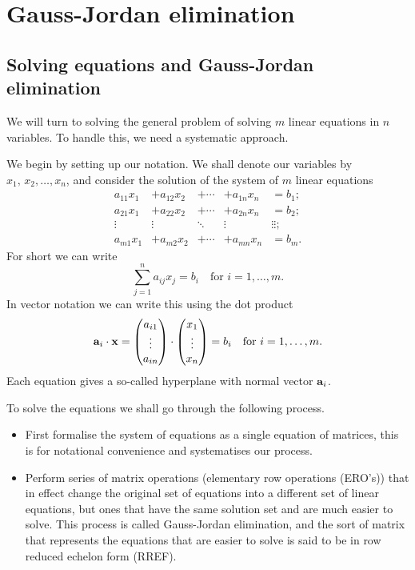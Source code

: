 \documentclass[10pt, a4paper]{article}
\begin{document}
\newpage

\section{Gauss-Jordan elimination}

\subsection{Solving equations and Gauss-Jordan elimination}
We will turn to solving the general problem of solving $m$ linear equations in $n$ variables. To handle this, we need a systematic approach.

We begin by setting up our notation. We shall denote our variables by $x_1,\,x_2,\dotsc,x_n$, and consider the solution of the system of $m$ linear equations
\begin{align*}
    a_{1 1}x_{1} &+ a_{1 2}x_2 &+ \dotsi &+ a_{1 n}x_n &= b_1; \\ 
    a_{2 1}x_{1} &+ a_{2 2}x_2 &+ \dotsi &+ a_{2 n}x_n &= b_2; \\ 
    \vdots & \vdots & \ddots & \vdots &\vdots \vdots; \\ 
    a_{m 1}x_{1} &+ a_{m 2}x_2 &+ \dotsi &+ a_{m n}x_n &= b_m.
\end{align*}
For short we can write
\[
\sum_{j = 1}^{n}a_{ij}x_{j} = b_{i}\quad\text{for } i = 1,\dotsc,m.
\]
In vector notation we can write this using the dot product
\[
\mathbf{a}_i \cdot \mathbf{x} = \begin{pmatrix}
    a_{i 1} \\ \vdots \\ a_{i n}
\end{pmatrix}
\cdot
\begin{pmatrix}
    x_1 \\ \vdots \\ x_n
\end{pmatrix}
=
b_i\quad\text{for } i = 1, \dotsc, m.
\]
Each equation gives a so-called hyperplane with normal vector $\mathbf{a}_i$.

To solve the equations we shall go through the following process.
\begin{itemize}
    \item First formalise the system of equations as a single equation of matrices, this is for notational convenience and systematises our process.
    \item Perform series of matrix operations (elementary row operations (ERO's)) that in effect change the original set of equations into a different set of linear equations, but ones that have the same solution set and are much easier to solve. This process is called Gauss-Jordan elimination, and the sort of matrix that represents the equations that are easier to solve is said to be in row reduced echelon form (RREF).
\end{itemize}
\end{document}
